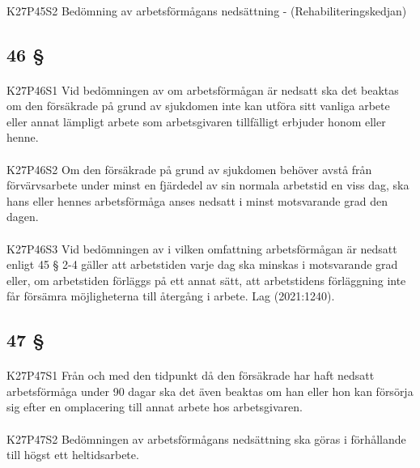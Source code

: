\documentclass[a4paper,notitlepage,openany,10pt]{book}
\begin{document}
\paragraph*{}
{\tiny K27P45S2}
Bedömning av arbetsförmågans nedsättning - (Rehabiliteringskedjan)
\subsection*{46 §}
\paragraph*{}
{\tiny K27P46S1}
Vid bedömningen av om arbetsförmågan är nedsatt ska det beaktas om den försäkrade på grund av sjukdomen inte kan utföra sitt vanliga arbete eller annat lämpligt arbete som arbetsgivaren tillfälligt erbjuder honom eller henne.
\paragraph*{}
{\tiny K27P46S2}
Om den försäkrade på grund av sjukdomen behöver avstå från förvärvsarbete under minst en fjärdedel av sin normala arbetstid en viss dag, ska hans eller hennes arbetsförmåga anses nedsatt i minst motsvarande grad den dagen.
\paragraph*{}
{\tiny K27P46S3}
Vid bedömningen av i vilken omfattning arbetsförmågan är nedsatt enligt 45 § 2-4 gäller att arbetstiden varje dag ska minskas i motsvarande grad eller, om arbetstiden förläggs på ett annat sätt, att arbetstidens förläggning inte får försämra möjligheterna till återgång i arbete.
Lag (2021:1240).
\subsection*{47 §}
\paragraph*{}
{\tiny K27P47S1}
Från och med den tidpunkt då den försäkrade har haft nedsatt arbetsförmåga under 90 dagar ska det även beaktas om han eller hon kan försörja sig efter en omplacering till annat arbete hos arbetsgivaren.
\paragraph*{}
{\tiny K27P47S2}
Bedömningen av arbetsförmågans nedsättning ska göras i förhållande till högst ett heltidsarbete.
\end{document}
